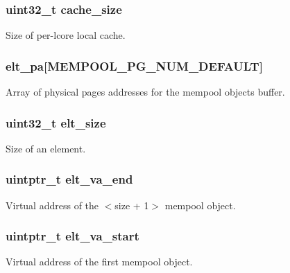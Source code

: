 \subsubsection[{cache\+\_\+size}]{\setlength{\rightskip}{0pt plus 5cm}uint32\+\_\+t cache\+\_\+size}\label{structrte__mempool_ac0fc8e6a5ca95e81e5d94522c86cfc9c}
Size of per-\/lcore local cache. \hypertarget{structrte__mempool_a1f424edf98249bd3d6816b65a3328dc4}{}
\subsubsection[{elt\+\_\+pa}]{ elt\+\_\+pa\mbox{[}{\bf M\+E\+M\+P\+O\+O\+L\+\_\+\+P\+G\+\_\+\+N\+U\+M\+\_\+\+D\+E\+F\+A\+U\+L\+T}\mbox{]}}\label{structrte__mempool_a1f424edf98249bd3d6816b65a3328dc4}
Array of physical pages addresses for the mempool objects buffer. \hypertarget{structrte__mempool_ad61e210d2df01bf9c91230fee6a8cf21}{}
\subsubsection[{elt\+\_\+size}]{\setlength{\rightskip}{0pt plus 5cm}uint32\+\_\+t elt\+\_\+size}\label{structrte__mempool_ad61e210d2df01bf9c91230fee6a8cf21}
Size of an element. \hypertarget{structrte__mempool_a7191a9fe4d62b69f2fa67c7713af39ac}{}
\subsubsection[{elt\+\_\+va\+\_\+end}]{\setlength{\rightskip}{0pt plus 5cm}uintptr\+\_\+t elt\+\_\+va\+\_\+end}\label{structrte__mempool_a7191a9fe4d62b69f2fa67c7713af39ac}
Virtual address of the $<$size + 1$>$ mempool object. \hypertarget{structrte__mempool_a4e38c11736523a0fd4b508c0e5797735}{}
\subsubsection[{elt\+\_\+va\+\_\+start}]{\setlength{\rightskip}{0pt plus 5cm}uintptr\+\_\+t elt\+\_\+va\+\_\+start}\label{structrte__mempool_a4e38c11736523a0fd4b508c0e5797735}
Virtual address of the first mempool object. \hypertarget{structrte__mempool_ac8bf36fe0577cba66bccda3a6f7e80a4}{}
